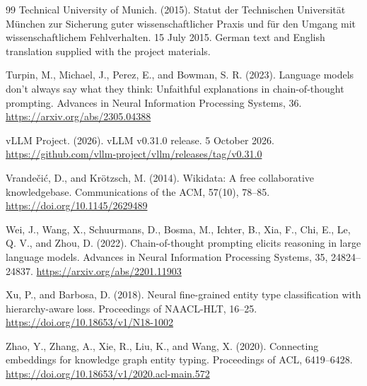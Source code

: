 \begin{thebibliography}{99}
Technical University of Munich. (2015). Statut der Technischen Universität München zur Sicherung guter wissenschaftlicher Praxis und für den Umgang mit wissenschaftlichem Fehlverhalten. 15 July 2015. German text and English translation supplied with the project materials.

Turpin, M., Michael, J., Perez, E., and Bowman, S. R. (2023). Language models don’t always say what they think: Unfaithful explanations in chain-of-thought prompting. Advances in Neural Information Processing Systems, 36. \url{https://arxiv.org/abs/2305.04388}

vLLM Project. (2026). vLLM v0.31.0 release. 5 October 2026. \url{https://github.com/vllm-project/vllm/releases/tag/v0.31.0}

Vrandečić, D., and Krötzsch, M. (2014). Wikidata: A free collaborative knowledgebase. Communications of the ACM, 57(10), 78–85. \url{https://doi.org/10.1145/2629489}

Wei, J., Wang, X., Schuurmans, D., Bosma, M., Ichter, B., Xia, F., Chi, E., Le, Q. V., and Zhou, D. (2022). Chain-of-thought prompting elicits reasoning in large language models. Advances in Neural Information Processing Systems, 35, 24824–24837. \url{https://arxiv.org/abs/2201.11903}

Xu, P., and Barbosa, D. (2018). Neural fine-grained entity type classification with hierarchy-aware loss. Proceedings of NAACL-HLT, 16–25. \url{https://doi.org/10.18653/v1/N18-1002}

Zhao, Y., Zhang, A., Xie, R., Liu, K., and Wang, X. (2020). Connecting embeddings for knowledge graph entity typing. Proceedings of ACL, 6419–6428. \url{https://doi.org/10.18653/v1/2020.acl-main.572}

\end{thebibliography}